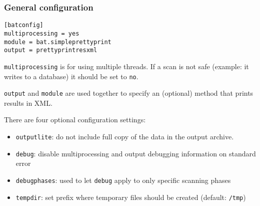\documentclass[11pt]{beamer}
\begin{document}
\begin{frame}[fragile]
\frametitle{General configuration}

\begin{verbatim}
[batconfig]
multiprocessing = yes
module = bat.simpleprettyprint
output = prettyprintresxml
\end{verbatim}

\texttt{multiprocessing} is for using multiple threads. If a scan is not safe (example: it writes to a database) it should be set to \texttt{no}.

\texttt{output} and \texttt{module} are used together to specify an (optional) method that prints results in XML.

There are four optional configuration settings:

\begin{itemize}
\item \texttt{outputlite}: do not include full copy of the data in the output archive.
\item \texttt{debug}: disable multiprocessing and output debugging information on standard error
\item \texttt{debugphases}: used to let \texttt{debug} apply to only specific scanning phases
\item \texttt{tempdir}: set prefix where temporary files should be created (default: \texttt{/tmp})
\end{itemize}

\end{frame}

\end{document}
